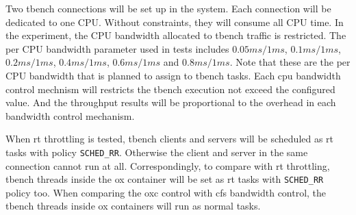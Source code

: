 Two tbench connections will be set up in the system.
Each connection will be dedicated to one CPU.
Without constraints, they will consume all CPU time.
In the experiment, the CPU bandwidth allocated to tbench traffic is restricted.
The per CPU bandwidth parameter used in tests includes
$0.05ms/1ms$, $0.1ms/1ms$, $0.2ms/1ms$, $0.4ms/1ms$, $0.6ms/1ms$ and 
$0.8ms/1ms$. 
Note that these are the per CPU bandwidth that is planned to assign to 
tbench tasks. Each cpu bandwidth control mechnism will restricts the 
tbench execution not exceed the configured value. And the throughput 
results will be proportional to the overhead in each bandwidth 
control mechanism.

When rt throttling is tested, tbench clients and servers will be 
scheduled as rt tasks with policy \texttt{SCHED\_RR}. Otherwise the client 
and server in the same connection cannot run at all. Correspondingly, to 
compare with rt throttling, tbench threads inside the ox container will 
be set as rt tasks with \texttt{SCHED\_RR} policy too. 
When comparing the oxc control with cfs bandwidth control, the tbench
threads inside ox containers will run as normal tasks. 

